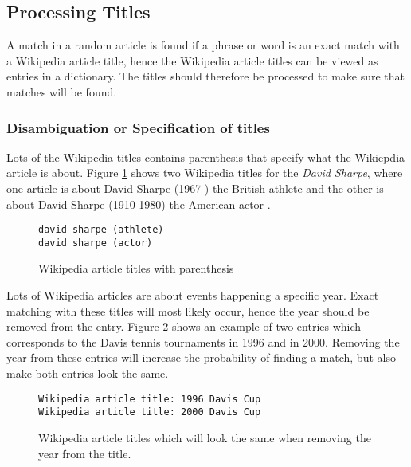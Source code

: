 \subsection{Processing Titles}
A match in a random article is found if a phrase or word is an exact match with a Wikipedia article title, hence the Wikipedia article titles can be viewed as entries in a dictionary. The titles should therefore be processed to make sure that matches will be found. 

\subsubsection{Disambiguation or Specification of titles}
Lots of the Wikipedia titles contains parenthesis that specify what the Wikiepdia article is about. Figure \ref{fig:parenthesis_example} shows two Wikipedia titles for the \emph{David Sharpe}, where one article is about David Sharpe (1967-) the British athlete  \cite{wiki:davidsharpeathlete} and the other is about David Sharpe (1910-1980) the American actor  \cite{wiki:davidshapreactor}.



\begin{figure}[h]
\centering
\begin{lstlisting}
david sharpe (athlete)
david sharpe (actor)
\end{lstlisting}
\caption{Wikipedia article titles with parenthesis}
\label{fig:parenthesis_example}
\end{figure}

Lots of Wikipedia articles are about events happening a specific year. Exact matching with these titles will most likely occur, hence the year should be removed from the entry.  Figure \ref{fig:davis_cups} shows an example of two entries which corresponds to the Davis tennis tournaments in 1996 and in 2000. Removing the year from these entries will increase the probability of finding a match, but also make both entries look the same. 

\begin{figure}[h]
\centering
\begin{lstlisting}
Wikipedia article title: 1996 Davis Cup
Wikipedia article title: 2000 Davis Cup
\end{lstlisting}
\caption{Wikipedia article titles which will look the same when removing the year from the title.}
\label{fig:davis_cups}
\end{figure}

